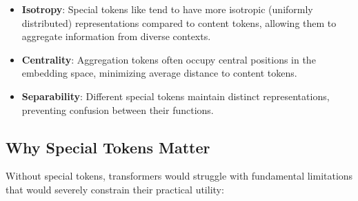 \begin{itemize}
\item \textbf{Isotropy}: Special tokens like \cls{} tend to have more isotropic (uniformly distributed) representations compared to content tokens, allowing them to aggregate information from diverse contexts.

\item \textbf{Centrality}: Aggregation tokens often occupy central positions in the embedding space, minimizing average distance to content tokens.

\item \textbf{Separability}: Different special tokens maintain distinct representations, preventing confusion between their functions.
\end{itemize}

\subsection{Why Special Tokens Matter}

Without special tokens, transformers would struggle with fundamental limitations that would severely constrain their practical utility:

